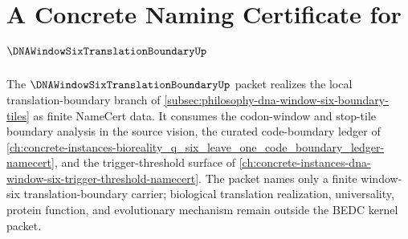\chapter{A Concrete Naming Certificate for $\DNAWindowSixTranslationBoundaryUp$}
\label{ch:concrete-instances-dna-window-six-translation-boundary-namecert}

The $\DNAWindowSixTranslationBoundaryUp$ packet realizes the local translation-boundary branch of \autoref{subsec:philosophy-dna-window-six-boundary-tiles} as finite NameCert data. It consumes the codon-window and stop-tile boundary analysis in the source vision, the curated code-boundary ledger of \autoref{ch:concrete-instances-bioreality_q_six_leave_one_code_boundary_ledger-namecert}, and the trigger-threshold surface of \autoref{ch:concrete-instances-dna-window-six-trigger-threshold-namecert}. The packet names only a finite window-six translation-boundary carrier; biological translation realization, universality, protein function, and evolutionary mechanism remain outside the BEDC kernel packet.

